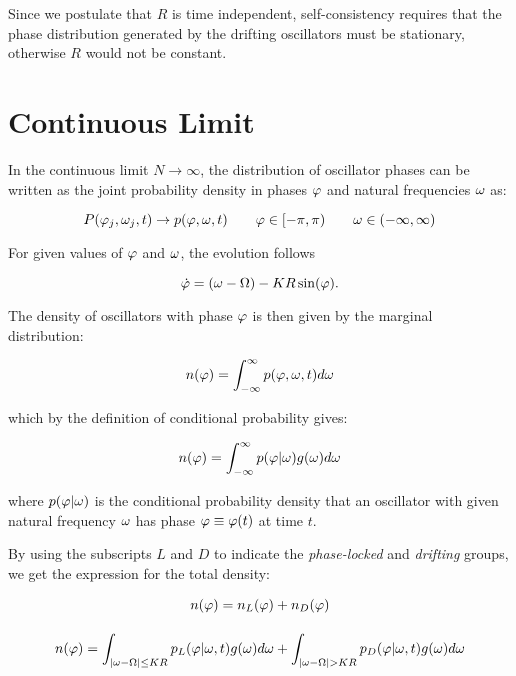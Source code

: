 Since we postulate that $R$ is time independent, self-consistency requires that the phase distribution generated by the drifting
oscillators must be stationary, otherwise $R$ would not be constant.

\section{Continuous Limit}

In the continuous limit $N\to \infty$, the distribution of oscillator phases can be written as the joint probability density in phases
$\varphi$ and natural frequencies $\omega$ as:

\begin{equation*}
	P(\varphi_j, \omega_j,t) \to p(\varphi, \omega,t) \qquad \varphi \in [-\pi, \pi) \qquad \omega \in (-\infty, \infty)
\end{equation*}

\noindent For given values of $\varphi$ and $\omega$, the evolution follows

\begin{equation}
	\dot{\varphi} = (\omega - \Omega) - K R \sin(\varphi).
	\label{eqmotioncontinuous}
\end{equation}

\noindent The density of oscillators with phase $\varphi$ is then given by the marginal distribution:

\begin{align*}
    n(\varphi) = \int_{-\infty}^{\infty} p(\varphi, \omega,t) d\omega
\end{align*}

\noindent which by the definition of conditional probability gives:

\begin{align*}
    n(\varphi) = \int_{-\infty}^{\infty} p(\varphi | \omega)g(\omega) d\omega
\end{align*}

\noindent where $p(\varphi|\omega)$ is the conditional probability density that an oscillator with given natural frequency
$\omega$ has phase $\varphi \equiv \varphi(t)$ at time $t$.

By using the subscripts $L$ and $D$ to indicate the \textit{phase-locked} and \textit{drifting} groups, we get the expression for the
total density:

\begin{gather}
    n(\varphi) = n_L(\varphi) + n_D(\varphi) \notag\\[10pt]
    n(\varphi) = \int_{|\omega - \Omega|\leq K R} p_L(\varphi|\omega,t) g(\omega) d\omega + \int_{|\omega - \Omega| > K R} p_D(\varphi|\omega,t) g(\omega) d\omega
    \label{density}
\end{gather}


